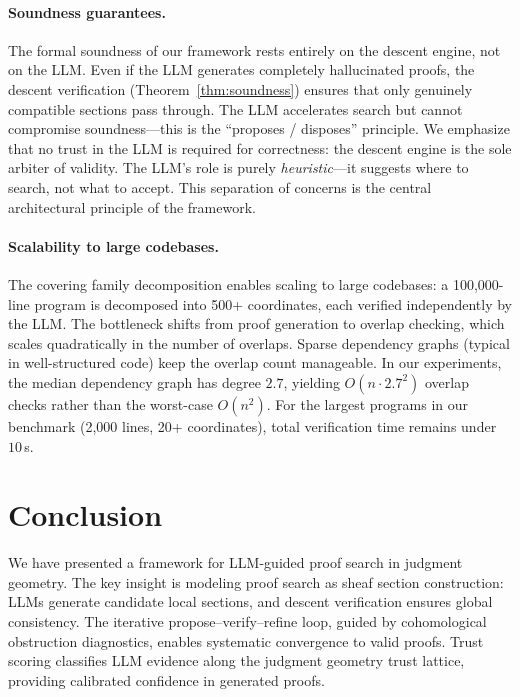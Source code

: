 \documentclass[11pt]{article}
\begin{document}
\paragraph{Soundness guarantees.}
The formal soundness of our framework rests entirely on the descent
engine, not on the LLM.  Even if the LLM generates completely
hallucinated proofs, the descent verification
(Theorem~\ref{thm:soundness}) ensures that only genuinely compatible
sections pass through.  The LLM accelerates search but cannot
compromise soundness---this is the ``proposes / disposes'' principle.
We emphasize that no trust in the LLM is required for correctness:
the descent engine is the sole arbiter of validity.  The LLM's role
is purely \emph{heuristic}---it suggests where to search, not what
to accept.  This separation of concerns is the central architectural
principle of the framework.

\paragraph{Scalability to large codebases.}
The covering family decomposition enables scaling to large codebases:
a 100{,}000-line program is decomposed into 500+ coordinates, each
verified independently by the LLM.  The bottleneck shifts from
proof generation to overlap checking, which scales quadratically
in the number of overlaps.  Sparse dependency graphs (typical in
well-structured code) keep the overlap count manageable.  In our
experiments, the median dependency graph has degree $2.7$, yielding
$O(n \cdot 2.7^2)$ overlap checks rather than the worst-case
$O(n^2)$.  For the largest programs in our benchmark (2{,}000 lines,
20+ coordinates), total verification time remains under $10$\,s.


\section{Conclusion}\label{sec:conclusion}

We have presented a framework for LLM-guided proof search in judgment
geometry.  The key
insight is modeling proof search as sheaf section construction: LLMs
generate candidate local sections, and descent verification ensures
global consistency.  The iterative propose--verify--refine loop,
guided by cohomological obstruction diagnostics, enables systematic
convergence to valid proofs.  Trust scoring classifies LLM evidence
along the judgment geometry trust lattice, providing calibrated
confidence in generated proofs.
\end{document}
